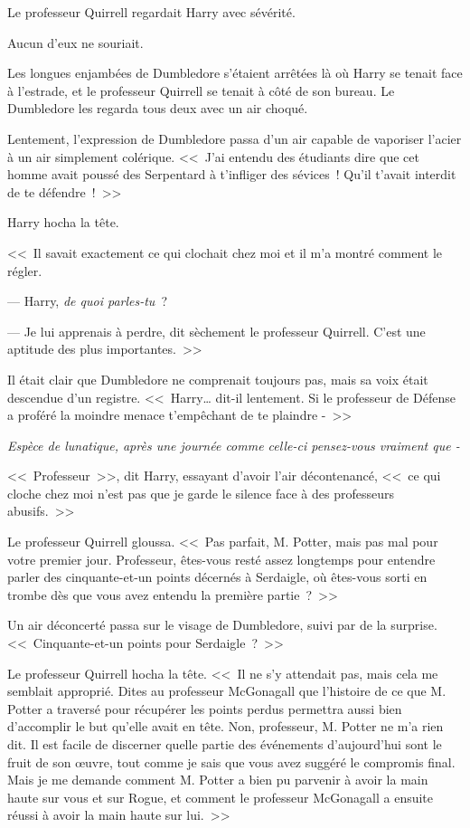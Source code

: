 Le professeur Quirrell regardait Harry avec sévérité.

Aucun d'eux ne souriait.

Les longues enjambées de Dumbledore s'étaient arrêtées là où Harry se tenait face à l'estrade, et le professeur Quirrell se tenait à côté de son bureau. Le Dumbledore les regarda tous deux avec un air choqué.

Lentement, l'expression de Dumbledore passa d'un air capable de vaporiser l'acier à un air simplement colérique. <<~J'ai entendu des étudiants dire que cet homme avait poussé des Serpentard à t'infliger des sévices~! Qu'il t'avait interdit de te défendre~!~>>

Harry hocha la tête.

<<~Il savait exactement ce qui clochait chez moi et il m'a montré comment le régler.

--- Harry, \emph{de quoi parles-tu}~?

--- Je lui apprenais à perdre, dit sèchement le professeur Quirrell. C'est une aptitude des plus importantes.~>>

Il était clair que Dumbledore ne comprenait toujours pas, mais sa voix était descendue d'un registre. <<~Harry… dit-il lentement. Si le professeur de Défense a proféré la moindre menace t'empêchant de te plaindre -~>>

\emph{Espèce de lunatique, après une journée comme celle-ci pensez-vous vraiment que -}

<<~Professeur~>>, dit Harry, essayant d'avoir l'air décontenancé, <<~ce qui cloche chez moi n'est pas que je garde le silence face à des professeurs abusifs.~>>

Le professeur Quirrell gloussa. <<~Pas parfait, M. Potter, mais pas mal pour votre premier jour. Professeur, êtes-vous resté assez longtemps pour entendre parler des cinquante-et-un points décernés à Serdaigle, où êtes-vous sorti en trombe dès que vous avez entendu la première partie~?~>>

Un air déconcerté passa sur le visage de Dumbledore, suivi par de la surprise. <<~Cinquante-et-un points pour Serdaigle~?~>>

Le professeur Quirrell hocha la tête. <<~Il ne s'y attendait pas, mais cela me semblait approprié. Dites au professeur McGonagall que l'histoire de ce que M. Potter a traversé pour récupérer les points perdus permettra aussi bien d'accomplir le but qu'elle avait en tête. Non, professeur, M. Potter ne m'a rien dit. Il est facile de discerner quelle partie des événements d'aujourd'hui sont le fruit de son œuvre, tout comme je sais que vous avez suggéré le compromis final. Mais je me demande comment M. Potter a bien pu parvenir à avoir la main haute sur vous et sur Rogue, et comment le professeur McGonagall a ensuite réussi à avoir la main haute sur lui.~>>

